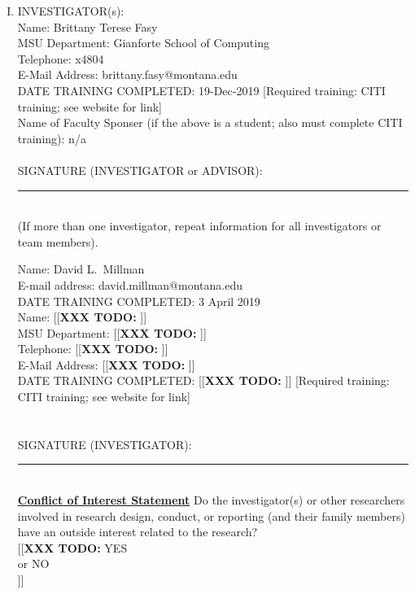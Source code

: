 \documentclass[12pt]{article}
\newcommand{\todo}[1]{{\color{red}[[\textbf{XXX TODO: }#1]]}}
\newcommand{\response}[1]{{\color{blue}#1}}
\newcommand{\yes}{{\color{blue}YES}\\ }
\newcommand{\no}{{\color{blue}NO}\\ }
\begin{document}
\begin{enumerate}[I.]
    \item INVESTIGATOR(s):\\
        Name: \response{Brittany Terese Fasy}\\
        MSU Department: \response{Gianforte School of Computing}\\
        Telephone: \response{x4804}\\
        E-Mail Address: \response{brittany.fasy@montana.edu}\\
        DATE TRAINING COMPLETED: \response{19-Dec-2019} [Required training: CITI
        training; see website for link]\\
        Name of Faculty Sponser (if the above is a student; also must complete
        CITI training): \response{n/a}
        \\~\\
        SIGNATURE (INVESTIGATOR or ADVISOR):\rule{0.5\linewidth}{\linethickness}   \\

        (If more than one investigator, repeat information for all investigators
        or team members).

        Name: \response{David L.\ Millman}\\
        E-mail address: \response{david.millman@montana.edu}\\
        DATE TRAINING COMPLETED: \response{3 April 2019}\\

        Name: \todo{}\\
        MSU Department: \todo{}\\
        Telephone: \todo{}\\
        E-Mail Address: \todo{}\\
        DATE TRAINING COMPLETED: \todo{} [Required training: CITI
        training; see website for link]\\
        \\~\\
        SIGNATURE (INVESTIGATOR):\rule{0.5\linewidth}{\linethickness}   \\

        {\bf \color{red} \underline{Conflict of Interest Statement}}
        Do the investigator(s) or other researchers involved in research design,
        conduct, or reporting (and their family members) have an outside
        interest related to the research?\\
        \todo{\yes or \no}


\end{enumerate}
\end{document}
